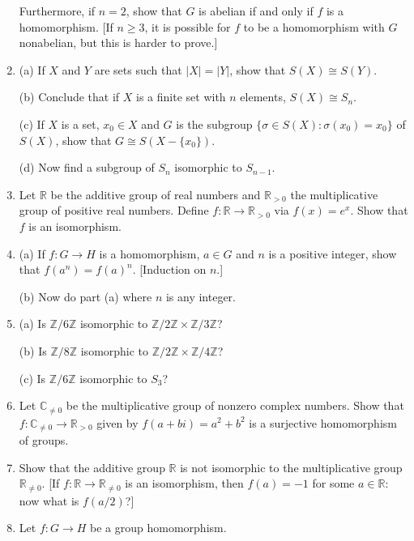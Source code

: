 \documentclass[leqno]{book}
\begin{document}
\begin{enumerate}
Furthermore, if $n=2$, show that $G$ is abelian if and only if $f$ is a homomorphism.  [If $n\geqslant 3$, it is possible for $f$ to be a homomorphism with $G$ nonabelian, but this is harder to prove.] %

\item (a) If $X$ and $Y$ are sets such that $|X|=|Y|$, show that $S(X)\cong S(Y)$.

(b) Conclude that if $X$ is a finite set with $n$ elements, $S(X)\cong S_n$.

(c) If $X$ is a set, $x_0\in X$ and $G$ is the subgroup $\{\sigma\in S(X):\sigma(x_0)=x_0\}$ of $S(X)$, show that $G\cong S(X-\{x_0\})$.

(d) Now find a subgroup of $S_n$ isomorphic to $S_{n-1}$.

\item Let $\mathbb R$ be the additive group of real numbers and $\mathbb R_{>0}$ the multiplicative group of positive real numbers.  Define $f:\mathbb R\to\mathbb R_{>0}$ via $f(x)=e^x$.  Show that $f$ is an isomorphism.

\item (a) If $f:G\to H$ is a homomorphism, $a\in G$ and $n$ is a positive integer, show that $f(a^n)=f(a)^n$.  [Induction on $n$.]

(b) Now do part (a) where $n$ is any integer.

\item (a) Is $\mathbb Z/6\mathbb Z$ isomorphic to $\mathbb Z/2\mathbb Z\times\mathbb Z/3\mathbb Z$?

(b) Is $\mathbb Z/8\mathbb Z$ isomorphic to $\mathbb Z/2\mathbb Z\times\mathbb Z/4\mathbb Z$?

(c) Is $\mathbb Z/6\mathbb Z$ isomorphic to $S_3$?

\item Let $\mathbb C_{\ne 0}$ be the multiplicative group of nonzero complex numbers.  Show that $f:\mathbb C_{\ne 0}\to\mathbb R_{>0}$ given by $f(a+bi)=a^2+b^2$ is a surjective homomorphism of groups.

\item Show that the additive group $\mathbb R$ is not isomorphic to the multiplicative group $\mathbb R_{\ne 0}$.  [If $f:\mathbb R\to\mathbb R_{\ne 0}$ is an isomorphism, then $f(a)=-1$ for some $a\in\mathbb R$: now what is $f(a/2)$?]

\item Let $f:G\to H$ be a group homomorphism.


\end{enumerate}
\end{document}
